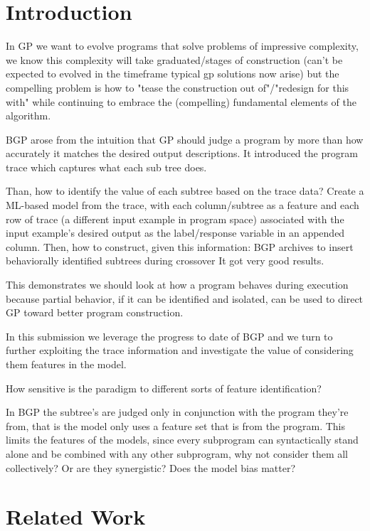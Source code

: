 \newcommand{\st}{subprogram\xspace} 

\section{Introduction}\label{sect:intro}
In GP we want to evolve programs that solve problems of impressive complexity, we know this complexity will take graduated/stages of construction (can't be expected to evolved in the timeframe typical gp solutions now arise) but the compelling problem is how to "tease the construction out of"/"redesign for this with" while continuing to embrace the (compelling) fundamental elements of the algorithm. 

BGP arose from the intuition that GP should judge a program by more than how accurately it matches the desired output descriptions. It introduced the program trace which captures what each sub tree does.

Than, how to identify the value of each subtree based on the trace data?  Create a ML-based model from the trace, with each column/subtree as a feature and each row of trace (a different input example in program space) associated with the input example's desired output as the label/response variable in an appended column.  
Then, how to construct, given this information:
BGP archives to insert behaviorally identified subtrees during crossover 
It got very good results. 

This demonstrates we should look at how a program behaves during execution because partial behavior, if it can be identified and isolated, can be used to direct GP toward better program construction.

In this submission we leverage the progress to date of BGP and we turn to further exploiting the trace information and investigate the value of considering them features in the model.

How sensitive is the paradigm to different sorts of feature identification?

In BGP the subtree's are judged only in conjunction with the program they're from, that is the model only uses a feature set that is  from the program. This limits the features of the models, since every subprogram can syntactically stand alone and be combined with any other subprogram, why not consider them all collectively? Or are they synergistic?  Does the model bias matter?
\newpage
\section{Related Work}\label{sect:rw}

